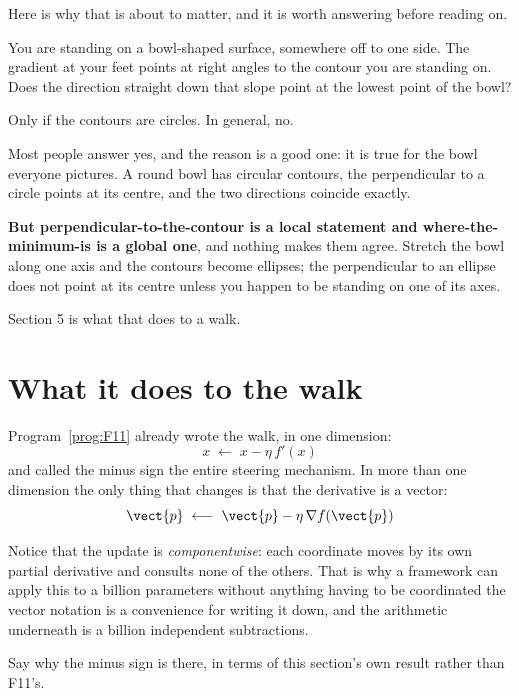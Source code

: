 \begin{fr}
Here is why that is about to matter, and it is worth answering before reading
on.

You are standing on a bowl-shaped surface, somewhere off to one side. The
gradient at your feet points at right angles to the contour you are standing
on. Does the direction straight down that slope point at the lowest point of
the bowl?
\dotline
\nextframe
\end{fr}

\begin{fr}
\begin{ansblock}
Only if the contours are circles. In general, no.
\end{ansblock}

Most people answer yes, and the reason is a good one: it is true for the bowl
everyone pictures. A round bowl has circular contours, the perpendicular to a
circle points at its centre, and the two directions coincide exactly.

\textbf{But perpendicular-to-the-contour is a local statement and
where-the-minimum-is is a global one}, and nothing makes them agree. Stretch
the bowl along one axis and the contours become ellipses; the perpendicular to
an ellipse does not point at its centre unless you happen to be standing on
one of its axes.

Section 5 is what that does to a walk.

\end{fr}

\section{What it does to the walk}
\label{sec:P15-zigzag}

\begin{fr}
Program~\ref{prog:F11} already wrote the walk, in one dimension:
\[ x \;\longleftarrow\; x - \eta\, f'(x) \]
and called the minus sign the entire steering mechanism. In more than one
dimension the only thing that changes is that the derivative is a vector:
\[ \vect{p} \;\longleftarrow\; \vect{p} - \eta\, \nabla f(\vect{p}) \]

Notice that the update is \emph{componentwise}: each coordinate moves by its
own partial derivative and consults none of the others. That is why a
framework can apply this to a billion parameters without anything having to
be coordinated \dash{} the vector notation is a convenience for writing it
down, and the arithmetic underneath is a billion independent subtractions.

Say why the minus sign is there, in terms of this section's own result rather
than F11's.
\dotline
\nextframe
\end{fr}

